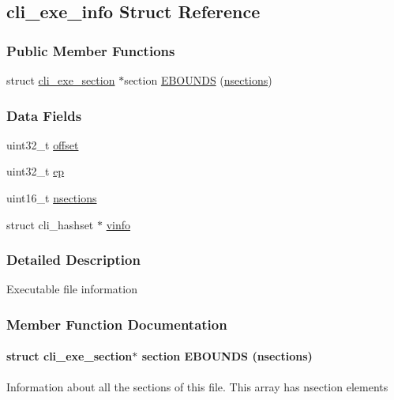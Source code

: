 \hypertarget{structcli__exe__info}{
\subsection{cli\_\-exe\_\-info Struct Reference}
\label{structcli__exe__info}
}
\subsubsection*{Public Member Functions}
\begin{DoxyCompactItemize}
\item 
struct \hyperlink{structcli__exe__section}{cli\_\-exe\_\-section} $\ast$section \hyperlink{structcli__exe__info_ad8c6e482c77eb51ce3d1294621ca31aa}{EBOUNDS} (\hyperlink{structcli__exe__info_aa4af5e526457df524fc9a4ba46803a70}{nsections})
\end{DoxyCompactItemize}
\subsubsection*{Data Fields}
\begin{DoxyCompactItemize}
\item 
uint32\_\-t \hyperlink{structcli__exe__info_a894bdfa2d603d8343f8ef01dda6fcd23}{offset}
\item 
uint32\_\-t \hyperlink{structcli__exe__info_afaed4671662028c061ab84eefcce0546}{ep}
\item 
uint16\_\-t \hyperlink{structcli__exe__info_aa4af5e526457df524fc9a4ba46803a70}{nsections}
\item 
struct cli\_\-hashset $\ast$ \hyperlink{structcli__exe__info_a45edc7cf7855a99b33ce31a17c6bdfc6}{vinfo}
\end{DoxyCompactItemize}


\subsubsection{Detailed Description}
Executable file information 

\subsubsection{Member Function Documentation}
\hypertarget{structcli__exe__info_ad8c6e482c77eb51ce3d1294621ca31aa}{
\paragraph[{EBOUNDS}]{\setlength{\rightskip}{0pt plus 5cm}struct {\bf cli\_\-exe\_\-section}$\ast$ section EBOUNDS ({\bf nsections})}\hfill}
\label{structcli__exe__info_ad8c6e482c77eb51ce3d1294621ca31aa}
Information about all the sections of this file. This array has {\ttfamily nsection} elements 

